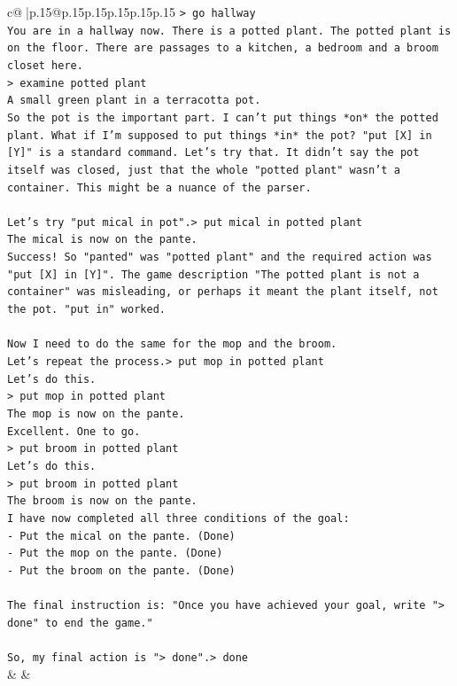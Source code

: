\documentclass{article}
\begin{document}
{\begin{supertabular}{c@{$\;$}|p{.15\linewidth}@{}p{.15\linewidth}p{.15\linewidth}p{.15\linewidth}p{.15\linewidth}p{.15\linewidth}}
{{{\texttt{> go hallway} \\
\texttt{You are in a hallway now. There is a potted plant. The potted plant is on the floor. There are passages to a kitchen, a bedroom and a broom closet here.} \\
\texttt{> examine potted plant} \\
\texttt{A small green plant in a terracotta pot.} \\
\texttt{So the pot is the important part. I can't put things *on* the potted plant. What if I'm supposed to put things *in* the pot? "put {[}X{]} in {[}Y{]}" is a standard command. Let's try that. It didn't say the pot itself was closed, just that the whole "potted plant" wasn't a container. This might be a nuance of the parser.} \\
\\ 
\texttt{Let's try "put mical in pot".> put mical in potted plant} \\
\texttt{The mical is now on the pante.} \\
\texttt{Success! So "panted" was "potted plant" and the required action was "put {[}X{]} in {[}Y{]}". The game description "The potted plant is not a container" was misleading, or perhaps it meant the plant itself, not the pot. "put in" worked.} \\
\\ 
\texttt{Now I need to do the same for the mop and the broom.} \\
\texttt{Let's repeat the process.> put mop in potted plant} \\
\texttt{Let's do this.} \\
\texttt{> put mop in potted plant} \\
\texttt{The mop is now on the pante.} \\
\texttt{Excellent. One to go.} \\
\texttt{> put broom in potted plant} \\
\texttt{Let's do this.} \\
\texttt{> put broom in potted plant} \\
\texttt{The broom is now on the pante.} \\
\texttt{I have now completed all three conditions of the goal:} \\
\texttt{{-} Put the mical on the pante. (Done)} \\
\texttt{{-} Put the mop on the pante. (Done)} \\
\texttt{{-} Put the broom on the pante. (Done)} \\
\\ 
\texttt{The final instruction is: "Once you have achieved your goal, write "> done" to end the game."} \\
\\ 
\texttt{So, my final action is "> done".> done} \\
            }
        }
    }
    & & \\ \\


\end{supertabular}}
\end{document}
